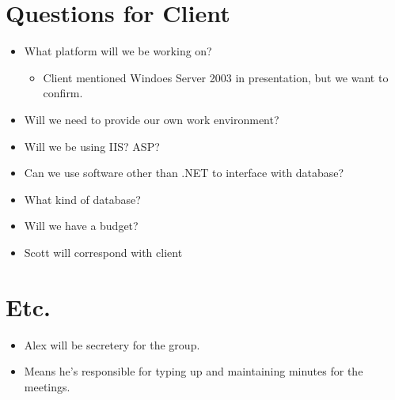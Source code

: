 \documentclass{article}
\begin{document}
\section{Questions for Client}
\begin{itemize}
\item What platform will we be working on?
	\begin{itemize}
	\item Client mentioned Windoes Server 2003 in presentation, but we want to confirm.
	\end{itemize}
\item Will we need to provide our own work environment?
\item Will we be using IIS?  ASP?
\item Can we use software other than .NET to interface with database?
\item What kind of database?
\item Will we have a budget?
\item Scott will correspond with client
\end{itemize}

\section{Etc.}
\begin{itemize}
\item Alex will be secretery for the group.
\item Means he's responsible for typing up and maintaining minutes for the meetings.
\end{itemize}
\end{document}
